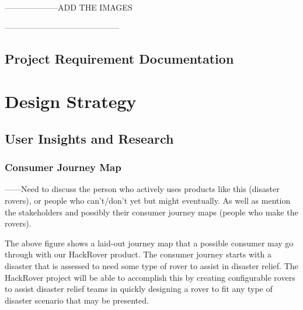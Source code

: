 \documentclass[a4paper, 10pt]{article}
\begin{document}
	--------------------ADD THE IMAGES
	
	------------------------------------------
	
\pagebreak

	\subsection*{Project Requirement Documentation}
	
	
\pagebreak

\section{Design Strategy}
	\subsection{User Insights and Research} 
		\subsubsection{Consumer Journey Map}
		------Need to discuss the person who actively uses products like this (disaster rovers), or people who can't/don't yet but might eventually. As well as mention the stakeholders and possibly their consumer journey maps (people who make the rovers).
		
			The above figure shows a laid-out journey map that a possible consumer may go through with our HackRover product. The consumer journey starts with a disaster that is assessed to need some type of rover to assist in disaster relief. The HackRover project will be able to accomplish this by creating configurable rovers to assist disaster relief teams in quickly designing a rover to fit any type of disaster scenario that may be presented.
			
\end{document}
